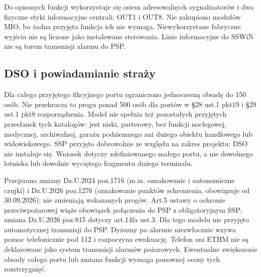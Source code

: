 Do opisanych funkcji wykorzystuje się osiem adresowalnych sygnalizatorów i dwa fizyczne styki informacyjne centrali: OUT1 i OUT8. Nie zakupiono modułów MIO, bo żadna przyjęta funkcja ich nie wymaga. Niewykorzystane fabryczne wyjścia nie są liczone jako instalowane sterowania. Linie informacyjne do SSWiN nie są torem transmisji alarmu do PSP.\cite{S-FIRE,S-FIRE-USER}

\subsection{DSO i powiadamianie straży}
Dla całego przyjętego fikcyjnego portu ograniczono jednoczesną obsadę do 150 osób. Nie przekracza to progu ponad 500 osób dla portów w §28 ust.1 pkt19 i §29 ust.1 pkt8 rozporządzenia. Model nie spełnia też pozostałych przyjętych przesłanek tych katalogów: jest niski, parterowy, bez funkcji noclegowej, medycznej, archiwalnej, garażu podziemnego ani dużego obiektu handlowego lub widowiskowego. SSP przyjęto dobrowolnie ze względu na zakres projektu; DSO nie instaluje się. Wniosek dotyczy zdefiniowanego małego portu, a nie dowolnego lotniska lub dowolnie wyciętego fragmentu dużego terminalu.\cite{L-FIRE}

Przejrzano zmiany Dz.U.2024 poz.1716 (m.in. oznakowanie i autonomiczne czujki) i Dz.U.2026 poz.1276 (oznakowanie punktów schronienia, obowiązuje od 30.09.2026); nie zmieniają wskazanych progów. Art.5 ustawy o ochronie przeciwpożarowej wiąże obowiązek połączenia do PSP z obligatoryjnym SSP; zmiana Dz.U.2026 poz.815 dotyczy art.14fa ust.3. Dla tego modelu nie przyjęto automatycznej transmisji do PSP. Dyżurny po alarmie niezwłocznie wzywa pomoc telefonicznie pod 112 i rozpoczyna ewakuację. Telefon ani ETHM nie są deklarowane jako system transmisji alarmów pożarowych. Ewentualne zwiększenie obsady całego portu lub zmiana funkcji wymaga ponownej oceny tych rozstrzygnięć.\cite{L-2024,L-2026,L-ACT,L-ACT-2026}
